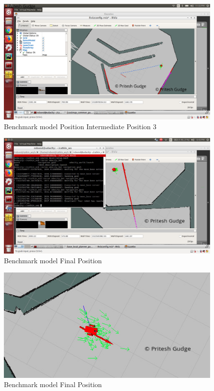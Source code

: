\documentclass[10pt,journal,compsoc]{IEEEtran}
\begin{document}
\begin{figure}[thpb]
      \centering
      \includegraphics[width=\linewidth]{images/29_goal_attempt_mid3_bm}
      \caption{Benchmark model Position Intermediate Position 3}
      \label{fig:benchresult5}
\end{figure}


\begin{figure}[thpb]
      \centering
      \includegraphics[width=\linewidth]{images/goal}
      \caption{Benchmark model Final Position}
      \label{fig:benchresult1}
\end{figure}

\begin{figure}[thpb]
      \centering
      \includegraphics[width=\linewidth]{images/goal_cropped_bm}
      \caption{Benchmark model Final Position}
      \label{fig:benchresult2}
\end{figure}
\end{document}
